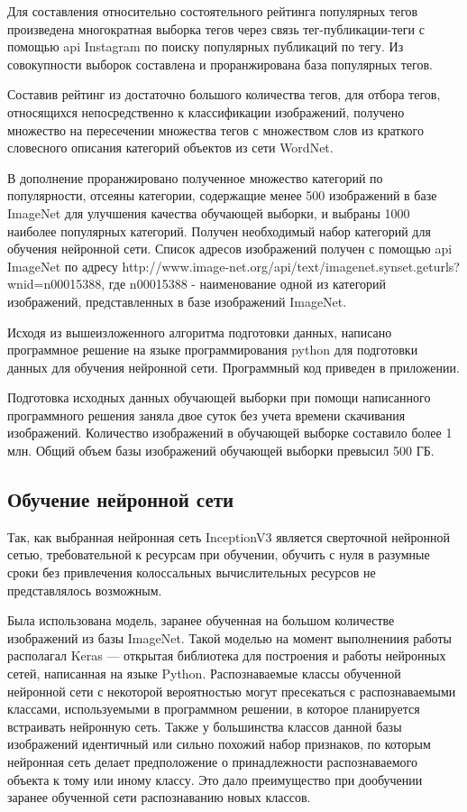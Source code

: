 Для составления относительно состоятельного рейтинга популярных тегов произведена многократная выборка тегов через связь тег-публикации-теги с помощью api Instagram по поиску популярных публикаций по тегу. 
Из совокупности выборок составлена и проранжирована база популярных тегов.

Составив рейтинг из достаточно большого количества тегов, для отбора тегов, относящихся непосредственно к классификации изображений, получено множество на пересечении множества тегов с множеством слов из краткого словесного описания категорий объектов из сети WordNet. 

В дополнение проранжировано полученное множество категорий по популярности, отсеяны категории, содержащие менее 500 изображений в базе ImageNet для улучшения качества обучающей выборки, и выбраны 1000 наиболее популярных категорий. 
Получен необходимый набор категорий для обучения нейронной сети. 
Список адресов изображений получен с помощью api ImageNet по адресу http://www.image-net.org/api/text/imagenet.synset.geturls?wnid=n00015388, где n00015388 - наименование одной из категорий изображений, представленных в базе изображений ImageNet.

Исходя из вышеизложенного алгоритма подготовки данных, написано программное решение на языке программирования python для подготовки данных для обучения нейронной сети. Программный код приведен в приложении.

Подготовка исходных данных обучающей выборки при помощи написанного программного решения заняла двое суток без учета времени скачивания изображений. 
Количество изображений в обучающей выборке составило более 1 млн. 
Общий объем базы изображений обучающей выборки превысил 500 ГБ.

\subsection{Обучение нейронной сети}

Так, как выбранная нейронная сеть InceptionV3 является сверточной нейронной сетью, требовательной к ресурсам при обучении, обучить с нуля в разумные сроки без привлечения колоссальных вычислительных ресурсов не представлялось возможным.

Была использована модель, заранее обученная на большом количестве изображений из базы ImageNet. 
Такой моделью на момент выполнениия работы располагал Keras — открытая библиотека для построения и работы нейронных сетей, написанная на языке Python. 
Распознаваемые классы обученной нейронной сети с некоторой вероятностью могут пресекаться с распознаваемыми классами, используемыми в программном решении, в которое планируется встраивать нейронную сеть. 
Также у большинства классов данной базы изображений идентичный или сильно похожий набор признаков, по которым нейронная сеть делает предположение о принадлежности распознаваемого объекта к тому или иному классу. 
Это дало преимущество при дообучении заранее обученной сети распознаванию новых классов.

